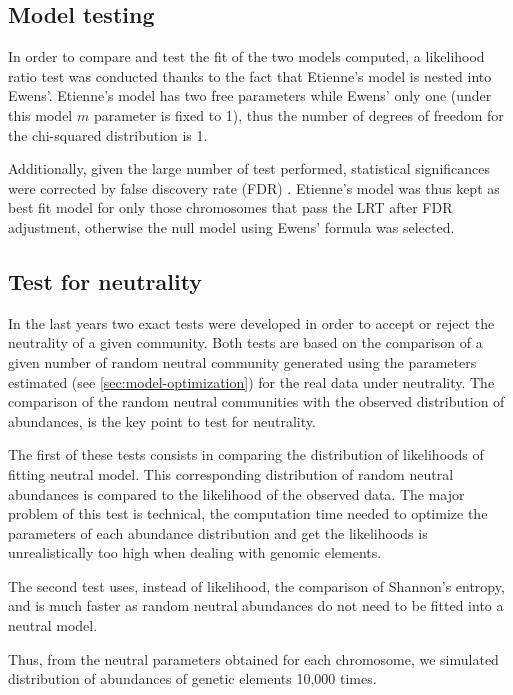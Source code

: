 \subsection{Model testing}

In order to compare and test the fit of the two models computed, a likelihood ratio test \cite{Wilks1938} was conducted thanks to the fact that Etienne's model is nested into Ewens'. Etienne's model has two free parameters while Ewens' only one (under this model $m$ parameter is fixed to 1), thus the number of degrees of freedom for the chi-squared distribution is 1.

Additionally, given the large number of test performed, statistical significances were corrected by false discovery rate (FDR) \cite{Benjamini2001}. Etienne's model was thus kept as best fit model for only those chromosomes that pass the LRT after FDR adjustment, otherwise the null model using Ewens' formula was selected.

\subsection{Test for neutrality}

In the last years two exact tests were developed in order to accept or reject the neutrality of a given community. Both tests are based on the comparison of a given number of random neutral community generated using the parameters estimated (see \ref{sec:model-optimization}) for the real data under neutrality. The comparison of the random neutral communities with the observed distribution of abundances, is the key point to test for neutrality.

The first of these tests \cite{Etienne2007} consists in comparing the distribution of likelihoods of fitting neutral model. This corresponding distribution of random neutral abundances is compared to the likelihood of the observed data. The major problem of this test is technical, the computation time needed to optimize the parameters of each abundance distribution and get the likelihoods is unrealistically too high when dealing with genomic elements.

The second test \cite{Jabot2011} uses, instead of likelihood, the comparison of Shannon's entropy, and is much faster as random neutral abundances do not need to be fitted into a neutral model.

Thus, from the neutral parameters obtained for each chromosome, we simulated distribution of abundances of genetic elements 10,000 times. 

